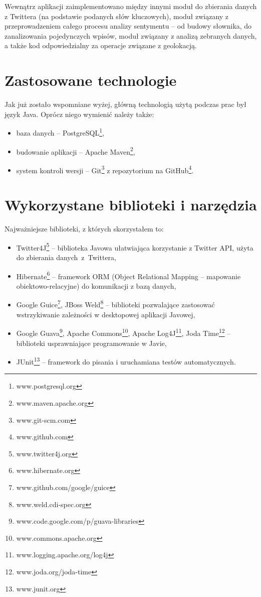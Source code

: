 Wewnątrz aplikacji zaimplementowano między innymi moduł do zbierania danych z
Twittera (na podstawie podanych słów kluczowych), moduł związany z
przeprowadzeniem całego procesu analizy sentymentu -- od budowy słownika, do
zanalizowania pojedynczych wpisów, moduł związany z analizą zebranych danych,
a także kod odpowiedzialny za operacje związane z geolokacją.

\section{Zastosowane technologie}
\label{section:zastosowanetechnologie}
Jak już zostało wspomniane wyżej, główną technologią użytą podczas prac był
język Java. Oprócz niego wymienić należy także:
\begin{itemize}
  \item baza danych -- PostgreSQL\footnote{www.postgresql.org},
  \item budowanie aplikacji -- Apache Maven\footnote{www.maven.apache.org},
  \item system kontroli wersji -- Git\footnote{www.git-scm.com} z 
  repozytorium na GitHub\footnote{www.github.com}.
\end{itemize}
\section{Wykorzystane biblioteki i narzędzia}
\label{section:bibliotekiinarzedzia}
Najważniejsze biblioteki, z których skorzystałem to:
\begin{itemize}
  \item Twitter4J\footnote{www.twitter4j.org} -- biblioteka Javowa ułatwiająca 
  korzystanie z Twitter API, użyta do zbierania \mbox{danych z Twittera,}
  
  \item Hibernate\footnote{www.hibernate.org} -- framework 
  ORM (Object Relational Mapping --  mapowanie obiektowo-relacyjne) do 
  komunikacji z bazą danych,
  
  \item Google Guice\footnote{www.github.com/google/guice}, 
  JBoss Weld\footnote{www.weld.cdi-spec.org} -- biblioteki pozwalające zastosować
  wstrzykiwanie zależności w desktopowej aplikacji Javowej,
  
  \item Google Guava\footnote{www.code.google.com/p/guava-libraries}, 
  Apache Commons\footnote{www.commons.apache.org}, 
  Apache Log4J\footnote{www.logging.apache.org/log4j}, 
  Joda Time\footnote{www.joda.org/joda-time} -- biblioteki
  usprawniające programowanie w Javie,
  
  \item JUnit\footnote{www.junit.org} -- framework do pisania i uruchamiana
  testów automatycznych.
\end{itemize}